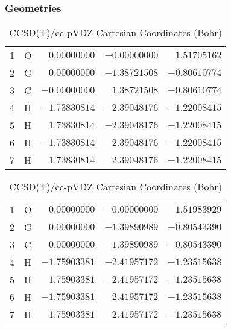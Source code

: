 \documentclass[10pt,oneside]{article}
\begin{document}
\clearpage

\subsection{}

\begin{table}[h!]
\subsubsection*{Geometries}
\begin{multicols}{2}
\centering
\caption{CCSD(T)/cc-pVTZ Cartesian Coordinates (Bohr)}
\begin{tabular}{llrrr}
\toprule
1  & O  & $ 0.00000000$ & $-0.00000000$ & $ 1.51705162$ \\
2  & C  & $ 0.00000000$ & $-1.38721508$ & $-0.80610774$ \\
3  & C  & $-0.00000000$ & $ 1.38721508$ & $-0.80610774$ \\
4  & H  & $-1.73830814$ & $-2.39048176$ & $-1.22008415$ \\
5  & H  & $ 1.73830814$ & $-2.39048176$ & $-1.22008415$ \\
6  & H  & $-1.73830814$ & $ 2.39048176$ & $-1.22008415$ \\
7  & H  & $ 1.73830814$ & $ 2.39048176$ & $-1.22008415$ \\
\bottomrule
\end{tabular}
\caption{CCSD(T)/cc-pVDZ Cartesian Coordinates (Bohr)}
\begin{tabular}{llrrr}
\toprule
1  & O  & $ 0.00000000$ & $-0.00000000$ & $ 1.51983929$ \\
2  & C  & $ 0.00000000$ & $-1.39890989$ & $-0.80543390$ \\
3  & C  & $ 0.00000000$ & $ 1.39890989$ & $-0.80543390$ \\
4  & H  & $-1.75903381$ & $-2.41957172$ & $-1.23515638$ \\
5  & H  & $ 1.75903381$ & $-2.41957172$ & $-1.23515638$ \\
6  & H  & $-1.75903381$ & $ 2.41957172$ & $-1.23515638$ \\
7  & H  & $ 1.75903381$ & $ 2.41957172$ & $-1.23515638$ \\
\bottomrule
\end{tabular}
\end{multicols}
\end{table}
\end{document}
